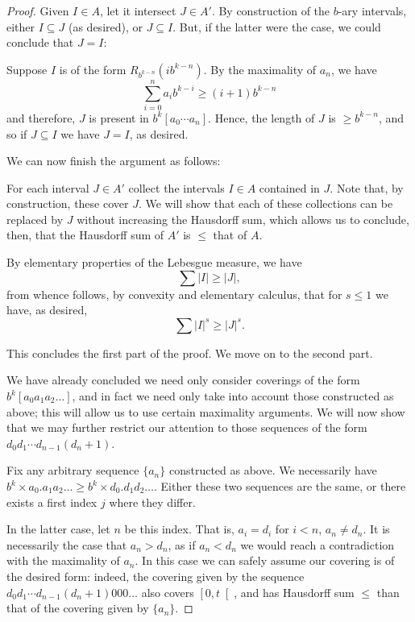 \documentclass[11pt, reqno]{amsart}
\begin{document}
\begin{proof}
Given $I \in A$, let it intersect $J \in A'$. By construction of the $b$-ary intervals, either $I \subseteq J$ (as desired), or $J \subseteq I$. But, if the latter were the case, we could conclude that $J = I$:

Suppose $I$ is of the form $R_{b^{k-n}}(i b^{k-n})$. By the maximality of $a_n$, we have
\[ \sum_{i = 0}^n a_i b^{k-i} \geq (i+1) b^{k-n} \]
and therefore, $J$ is present in $b^k [a_0 \cdots a_n]$. Hence, the length of $J$ is $\geq b^{k-n}$, and so if $J \subseteq I$ we have $J = I$, as desired.

We can now finish the argument as follows:

For each interval $J \in A'$ collect the intervals $I \in A$ contained in $J$. Note that, by construction, these cover $J$. We will show that each of these collections can be replaced by $J$ without increasing the Hausdorff sum, which allows us to conclude, then, that the Hausdorff sum of $A'$ is $\leq$ that of $A$.

By elementary properties of the Lebesgue measure, we have
\[ \sum \lvert I \rvert \geq \lvert J \rvert,\]
from whence follows, by convexity and elementary calculus, that for $s \leq 1$ we have, as desired,
\[ \sum \lvert I \rvert^s \geq \lvert J \rvert^s.\]

This concludes the first part of the proof. We move on to the second part.

We have already concluded we need only consider coverings of the form $b^k [a_0 a_1 a_2 \dots]$, and in fact we need only take into account those constructed as above; this will allow us to use certain maximality arguments. We will now show that we may further restrict our attention to those sequences of the form $d_0 d_1 \cdots d_{n-1} (d_n + 1)$.

Fix any arbitrary sequence $\{a_n\}$ constructed as above. We necessarily have $b^k \times a_0 . a_1 a_2 \dots \geq b^k \times d_0 . d_1 d_2 \dots$. Either these two sequences are the same, or there exists a first index $j$ where they differ.

In the latter case, let $n$ be this index. That is, $a_i = d_i$ for $i < n$, $a_n \neq d_n$. It is necessarily the case that $a_n > d_n$, as if $a_n < d_n$ we would reach a contradiction with the maximality of $a_n$. In this case we can safely assume our covering is of the desired form: indeed, the covering given by the sequence $d_0 d_1 \cdots d_{n-1} (d_n + 1) 0 0 0 \dots$ also covers $\left[0, t \right[$, and has Hausdorff sum $\leq$ than that of the covering given by $\{a_n\}$.


\end{proof}
\end{document}
